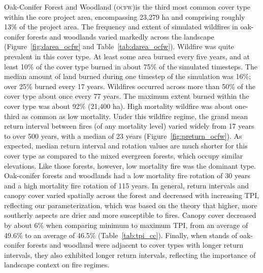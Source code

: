 Oak-Conifer Forest and Woodland (\textsc{ocfw})is the third most common cover type within the core project area, encompassing 23,279 ha and comprising roughly 13\% of the project area. The frequency and extent of simulated wildfires in oak-conifer forests and woodlands varied markedly across the landscape (Figure~\ref{fig:darea_ocfw} and Table~\ref{tab:darea_ocfw}).  %
%
Wildfire was quite prevalent in this cover type. At least some area burned every five years, and at least 10\% of the cover type burned in about 75\% of the simulated timesteps. The median amount of land burned during one timestep of the simulation was 16\%; over 25\% burned every 17 years. Wildfires occurred across more than 50\% of the cover type about once every 77 years. The maximum extent burned within the cover type was about 92\% (21,400 ha). High mortality wildfire was about one-third as common as low mortality. %
%
Under this wildfire regime, the grand mean return interval between fires (of any mortality level) varied widely from 17 years to over 500 years, with a median of 23 years (Figure~\ref{fig:preturn_ocfw}). As expected, median return interval and rotation values are much shorter for this cover type as compared to the mixed evergreen forests, which occupy similar elevations. Like those forests, however, low mortality fire was the dominant type. Oak-conifer forests and woodlands had a low mortality fire rotation of 30 years and a high mortality fire rotation of 115 years. %
%
In general, return intervals and canopy cover varied spatially across the forest and decreased with increasing TPI, reflecting our parameterization, which was based on the theory that higher, more southerly aspects are drier and more susceptible to fires. Canopy cover decreased by about 6\% when comparing minimum to maximum TPI, from an average of 49.6\% to an average of 46.5\% (Table~\ref{tab:tpi_cc}). %
%
Finally, when stands of oak-conifer forests and woodland were adjacent to cover types with longer return intervals, they also exhibited longer return intervals, reflecting the importance of landscape context on fire regimes.

